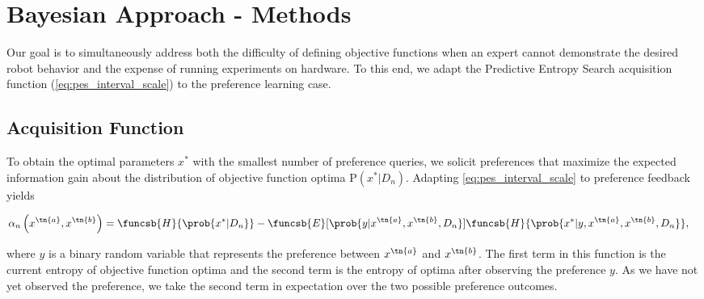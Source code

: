 \section{Bayesian Approach - Methods}
Our goal is to simultaneously address both the difficulty of defining objective
functions when an expert cannot demonstrate the desired robot behavior and the
expense of running experiments on hardware. To this end, we adapt the Predictive
Entropy Search acquisition function (\cref{eq:pes_interval_scale}) to the
preference learning case.

\subsection{Acquisition Function}
To obtain the optimal parameters $x^*$ with the smallest number of preference
queries, we solicit preferences that maximize the expected information gain
about the distribution of objective function optima $\mathrm{P}(x^*|D_n)$.
Adapting \cref{eq:pes_interval_scale} to preference feedback yields
\begin{fullwidth}
\begin{align}
    &\alpha_n \left(x^\tn{a}, x^\tn{b}\right) 
        = \funcsb{H}{\prob{x^*|D_n}} - \funcsb{E}[\prob{y|x^\tn{a},x^\tn{b},D_n}]
            {\funcsb{H}{\prob{x^*|y, x^\tn{a}, x^\tn{b}, D_n}}},
    \label{eq:acquisition_orig}
\end{align}
\end{fullwidth}
where $y$ is a binary random variable that represents the preference between
$x^\tn{a}$ and $x^\tn{b}$. The first term in this function is the current
entropy of objective function optima and the second term is the entropy of
optima after observing the preference $y$. As we have not yet observed the
preference, we take the second term in expectation over the two possible
preference outcomes.

